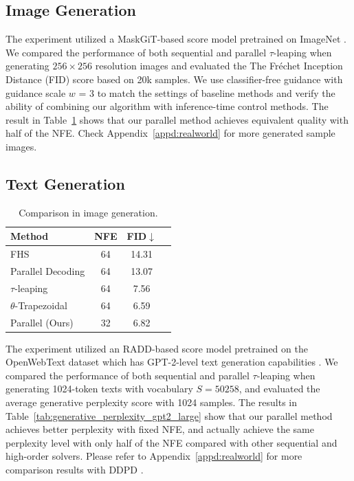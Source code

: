 \documentclass{article}
\begin{document}
\subsection{Image Generation}

The experiment utilized a MaskGiT-based score model \citep{besnier2023pytorch,chang2022maskgit} pretrained on ImageNet \citep{deng2009imagenet}. We compared the performance of both sequential and parallel $\tau$-leaping when generating $256\times256$ resolution images and evaluated the The Fréchet Inception Distance (FID) score based on 20k samples. We use classifier-free guidance with guidance scale $w$ = 3 to match the settings of baseline methods and verify the ability of combining our algorithm with inference-time control methods. The result in Table~\ref{tab:imagenet_data} shows that our parallel method achieves equivalent quality with half of the NFE. Check Appendix~\ref{appd:realworld} for more generated sample images.



\subsection{Text Generation}
\begin{table}
\centering
\captionsetup{skip=8pt}
\small
\caption{Comparison in image generation.}
\label{tab:imagenet_data}
\begin{tabular}{lccc}
\toprule
\textbf{Method}   & \textbf{NFE}  & \textbf{FID}$\downarrow$   \\ \midrule
FHS & 64  & 14.31 \\ 
Parallel Decoding & 64  & 13.07 \\ 
$\tau$-leaping & 64  & 7.56 \\ 
$\theta$-Trapezoidal & 64  & 6.59 \\
Parallel (Ours)   & 32  & 6.82 \\ 
\bottomrule
\end{tabular}
\end{table}
The experiment utilized an RADD-based score model \citep{ou2024your} pretrained on the OpenWebText dataset \citep{Gokaslan2019OpenWeb} which has GPT-2-level text generation capabilities \citep{radford2019language}. We compared the performance of both sequential and parallel $\tau$-leaping when generating 1024-token texts with vocabulary $S = 50258$, and evaluated the average generative perplexity score with 1024 samples. The results in Table~\ref{tab:generative_perplexity_gpt2_large} show that our parallel method achieves better perplexity with fixed NFE, and actually achieve the same perplexity level with only half of the NFE compared with other sequential and high-order solvers. Please refer to Appendix~\ref{appd:realworld} for more comparison results with DDPD \citep{liu2024think}. 
\end{document}
